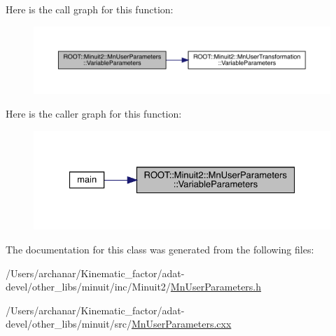 Here is the call graph for this function\+:
\nopagebreak
\begin{figure}[H]
\begin{center}
\leavevmode
\includegraphics[width=350pt]{d6/d10/classROOT_1_1Minuit2_1_1MnUserParameters_af19ee84626fbdeb819e6a86e82794f19_cgraph}
\end{center}
\end{figure}
Here is the caller graph for this function\+:
\nopagebreak
\begin{figure}[H]
\begin{center}
\leavevmode
\includegraphics[width=327pt]{d6/d10/classROOT_1_1Minuit2_1_1MnUserParameters_af19ee84626fbdeb819e6a86e82794f19_icgraph}
\end{center}
\end{figure}


The documentation for this class was generated from the following files\+:\begin{DoxyCompactItemize}
\item 
/\+Users/archanar/\+Kinematic\+\_\+factor/adat-\/devel/other\+\_\+libs/minuit/inc/\+Minuit2/\mbox{\hyperlink{adat-devel_2other__libs_2minuit_2inc_2Minuit2_2MnUserParameters_8h}{Mn\+User\+Parameters.\+h}}\item 
/\+Users/archanar/\+Kinematic\+\_\+factor/adat-\/devel/other\+\_\+libs/minuit/src/\mbox{\hyperlink{adat-devel_2other__libs_2minuit_2src_2MnUserParameters_8cxx}{Mn\+User\+Parameters.\+cxx}}\end{DoxyCompactItemize}
